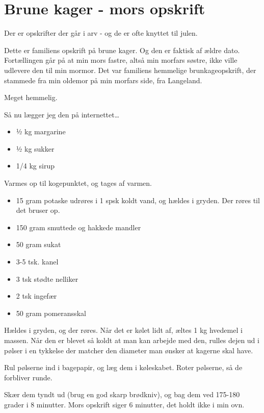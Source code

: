 \documentclass[
]{book}
\providecommand{\tightlist}{%
  \setlength{\itemsep}{0pt}\setlength{\parskip}{0pt}}
\begin{document}
\section{Brune kager - mors opskrift}\label{brune-kager---mors-opskrift}

Der er opskrifter der går i arv - og de er ofte knyttet til julen.

Dette er familiens opskrift på brune kager. Og den er faktisk af ældre dato. Fortællingen går på at min mors fastre, altså min morfars søstre, ikke ville udlevere den til min mormor. Det var familiens hemmelige brunkageopskrift, der stammede fra min oldemor på min morfars side, fra Langeland.

Meget hemmelig.

Så nu lægger jeg den på internettet\ldots{}

\begin{itemize}
\tightlist
\item
  ½ kg margarine
\item
  ½ kg sukker
\item
  1/4 kg sirup
\end{itemize}

Varmes op til kogepunktet, og tages af varmen.

\begin{itemize}
\tightlist
\item
  15 gram potaske udrøres i 1 spsk koldt vand, og hældes i gryden. Der røres til det bruser op.
\item
  150 gram smuttede og hakkede mandler
\item
  50 gram sukat
\item
  3-5 tsk. kanel
\item
  3 tsk stødte nelliker
\item
  2 tsk ingefær
\item
  50 gram pomeransskal
\end{itemize}

Hældes i gryden, og der røres. Når det er kølet lidt af, æltes 1 kg hvedemel i massen. Når den er blevet så koldt at man kan arbejde med den, rulles dejen ud i pølser i en tykkelse der matcher den diameter man ønsker at kagerne skal have.

Rul pølserne ind i bagepapir, og læg dem i køleskabet. Roter pølserne, så de forbliver runde.

Skær dem tyndt ud (brug en god skarp brødkniv), og bag dem ved 175-180 grader i 8 minutter. Mors opskrift siger 6 minutter, det holdt ikke i min ovn.
\end{document}
